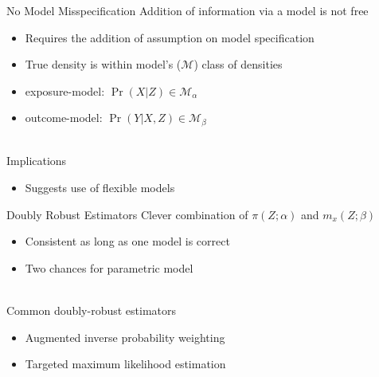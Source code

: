 \documentclass{beamer}
\begin{document}
\begin{frame}{No Model Misspecification}
	Addition of information via a model is not free
	\begin{itemize}
		\item Requires the addition of assumption on model specification
		\item True density is within model's ($\mathcal{M}$) class of densities 
		\item exposure-model: $\Pr(X|Z) \in \mathcal{M}_{\alpha}$
		\item outcome-model: $\Pr(Y|X,Z) \in \mathcal{M}_{\beta}$
	\end{itemize}~\\
	Implications
	\begin{itemize}
		\item Suggests use of flexible models
	\end{itemize}
\end{frame}

\begin{frame}{Doubly Robust Estimators}
	Clever combination of $\pi(Z;\alpha)$ and $m_x(Z;\beta)$
	\begin{itemize}
		\item Consistent as long as one model is correct
		\item Two chances for parametric model
	\end{itemize}~\\
	Common doubly-robust estimators
	\begin{itemize}
		\item Augmented inverse probability weighting
		\item Targeted maximum likelihood estimation
	\end{itemize}
\end{frame}

\end{document}
